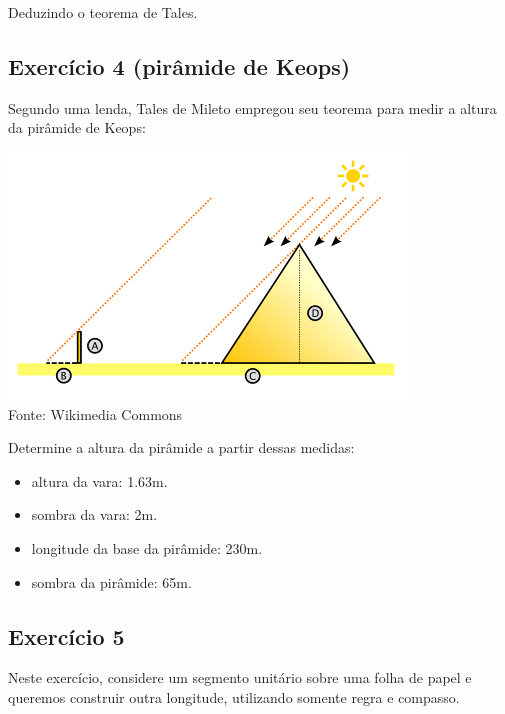 Deduzindo o teorema de Tales.

\subsection*{Exercício 4 (pirâmide de Keops)}

Segundo uma lenda, Tales de Mileto empregou seu teorema para medir a altura da
pirâmide de Keops:

\begin{center}
\includegraphics{cheops.png}\\
Fonte: Wikimedia Commons
\end{center}

Determine a altura da pirâmide a partir dessas medidas:

\begin{itemize}
  \item altura da vara: 1.63m.
  \item sombra da vara: 2m.
  \item longitude da base da pirâmide: 230m.
  \item sombra da pirâmide: 65m.
\end{itemize}

\subsection*{Exercício 5}

Neste exercício, considere um segmento unitário sobre uma folha de papel e
queremos construir outra longitude, utilizando somente regra e compasso.

\begin{center}
\end{center}

